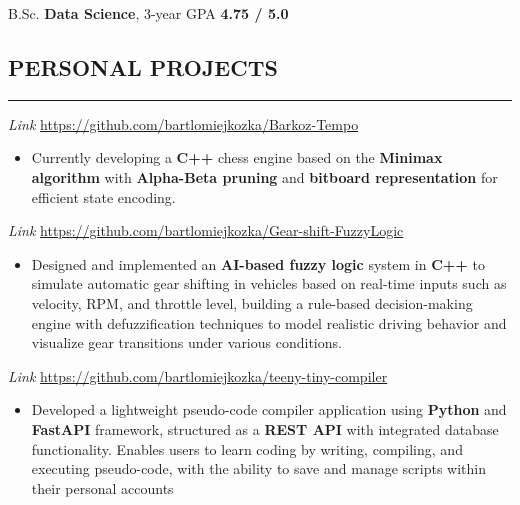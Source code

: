 \documentclass[9pt]{extarticle}
\begin{document}
\noindent
{}
B.Sc. \textbf{Data Science}, 3-year GPA \textbf{4.75 / 5.0}


\subsection*{PERSONAL PROJECTS}
\vspace{-1.5em}
\rule{\textwidth}{0.1pt}
\vspace{-0.5em}

\noindent
{}
\textit{Link}
\href{https://github.com/bartlomiejkozka/Barkoz-Tempo}{https://github.com/bartlomiejkozka/Barkoz-Tempo}
\begin{itemize}[itemsep=-3pt, topsep=3pt]
    \item Currently developing a \textbf{C++} chess engine based on the \textbf{Minimax algorithm} with \textbf{Alpha-Beta pruning} and \textbf{bitboard representation} for efficient state encoding.
\end{itemize}

\noindent
{}
\textit{Link}
\href{https://github.com/bartlomiejkozka/Gear-shift-FuzzyLogic}{https://github.com/bartlomiejkozka/Gear-shift-FuzzyLogic}
\begin{itemize}[itemsep=-3pt, topsep=3pt]
    \item Designed and implemented an \textbf{AI-based fuzzy logic} system in \textbf{C++} to simulate automatic gear shifting in vehicles based on real-time inputs such as velocity, RPM, and throttle level, building a rule-based decision-making engine with defuzzification techniques to model realistic driving behavior and visualize gear transitions under various conditions.
\end{itemize}

\noindent
{}
\textit{Link}
\href{https://github.com/bartlomiejkozka/teeny-tiny-compiler}{https://github.com/bartlomiejkozka/teeny-tiny-compiler}
\begin{itemize}[itemsep=-3pt, topsep=3pt]
    \item Developed a lightweight pseudo-code compiler application using \textbf{Python} and \textbf{FastAPI}
          framework, structured as a \textbf{REST API} with integrated database functionality.
          Enables users to learn coding by writing, compiling, and executing pseudo-code, with the
          ability to save and manage scripts within their personal accounts
\end{itemize}
\end{document}
